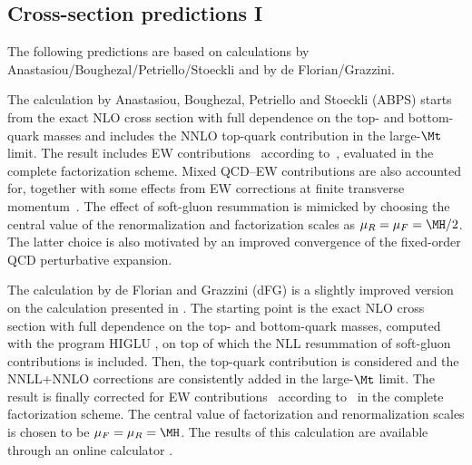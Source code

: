 \subsection{Cross-section predictions I}
\label{se:ggfXS1}

The following predictions are based on calculations by
Anastasiou/Boughezal/Petriello/Stoeckli and by de Florian/Grazzini. 

The calculation by Anastasiou, Boughezal, Petriello and Stoeckli (ABPS) \cite{Anastasiou:2008tj}
starts from the exact NLO cross section with full dependence on the top- and bottom-quark masses
and includes the NNLO top-quark contribution
in the large-$\Mt$ limit. The result includes EW contributions~\cite{Aglietti:2004nj,Degrassi:2004mx,Actis:2008ug,Actis:2008ts} according 
to~, evaluated in the complete factorization scheme.  Mixed QCD--EW contributions \cite{Anastasiou:2008tj} are 
also accounted for, together with some effects from EW corrections at finite transverse momentum~\cite{Keung:2009bs}. The effect of soft-gluon 
resummation is mimicked
by choosing
the central value of the renormalization and factorization scales
as $\mu_R=\mu_F=\MH/2$.
The latter choice is also motivated by an improved convergence of the fixed-order QCD perturbative expansion.


The calculation by de Florian and Grazzini (dFG)
is a slightly improved version on the calculation presented in .
The starting point is the exact NLO cross section with full dependence on
the top- and bottom-quark masses, computed with the program {\sc HIGLU} \cite{Graudenz:1992pv,Spira:1995rr}, on top of which the NLL resummation of soft-gluon contributions is included.
Then, the top-quark contribution is considered and the
NNLL+NNLO corrections \cite{Catani:2003zt} are consistently added in the large-$\Mt$ limit. The result is finally corrected for EW 
contributions~\cite{Aglietti:2004nj,Degrassi:2004mx,Actis:2008ug,Actis:2008ts} according to~ in 
the complete factorization scheme. The central value of factorization and renormalization scales is chosen
to be $\mu_F=\mu_R=\MH$.  The results of this calculation are available through an online calculator \cite{calculator}.

